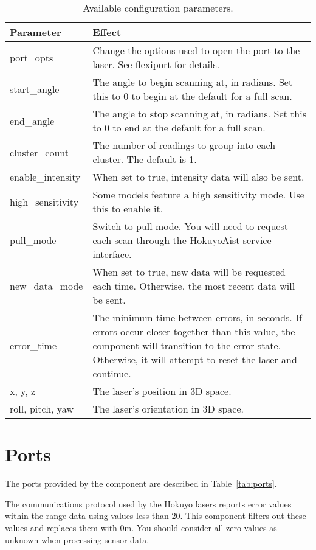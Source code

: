 \documentclass[a4paper,10pt]{article}
\begin{document}
\begin{table}[t]
  \centering
  \begin{tabularx}{\columnwidth}{lX}
    \toprule
    Parameter & Effect \\
    \midrule
    port\_opts & Change the options used to open the port to the laser. See flexiport for details. \\
    start\_angle & The angle to begin scanning at, in radians. Set this to 0 to begin at the default for a full scan. \\
    end\_angle & The angle to stop scanning at, in radians. Set this to 0 to end at the default for a full scan. \\
    cluster\_count & The number of readings to group into each cluster. The default is 1. \\
    enable\_intensity & When set to true, intensity data will also be sent. \\
    high\_sensitivity & Some models feature a high sensitivity mode. Use this to enable it. \\
    pull\_mode & Switch to pull mode. You will need to request each scan through the HokuyoAist service interface. \\
    new\_data\_mode & When set to true, new data will be requested each time. Otherwise, the most recent data will be sent. \\
    error\_time & The minimum time between errors, in seconds. If errors occur closer together than this value, the component will transition to the error state. Otherwise, it will attempt to reset the laser and continue. \\
    x, y, z & The laser's position in 3D space. \\
    roll, pitch, yaw & The laser's orientation in 3D space. \\
    \bottomrule
  \end{tabularx}
  \caption{Available configuration parameters.}
  \label{tab:config_params}
\end{table}

\section{Ports}
\label{sec:port}

The ports provided by the component are described in Table~\ref{tab:ports}.

The communications protocol used by the Hokuyo lasers reports error values
within the range data using values less than 20. This component filters out
these values and replaces them with 0m. You should consider all zero values as
unknown when processing sensor data.
\end{document}
